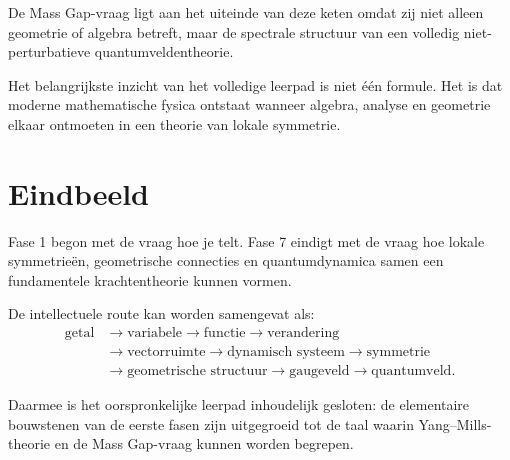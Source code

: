 \documentclass[11pt,a4paper]{article}
\begin{document}
De Mass Gap-vraag ligt aan het uiteinde van deze keten omdat zij niet alleen geometrie of algebra betreft, maar de spectrale structuur van een volledig niet-perturbatieve quantumveldentheorie.

\begin{kernidee}
Het belangrijkste inzicht van het volledige leerpad is niet één formule. Het is dat moderne mathematische fysica ontstaat wanneer algebra, analyse en geometrie elkaar ontmoeten in een theorie van lokale symmetrie.
\end{kernidee}

\section*{Eindbeeld}

Fase 1 begon met de vraag hoe je telt. Fase 7 eindigt met de vraag hoe lokale symmetrieën, geometrische connecties en quantumdynamica samen een fundamentele krachtentheorie kunnen vormen.

De intellectuele route kan worden samengevat als:
\[
\begin{aligned}
\text{getal} &\to \text{variabele} \to \text{functie} \to \text{verandering} \\
&\to \text{vectorruimte} \to \text{dynamisch systeem} \to \text{symmetrie} \\
&\to \text{geometrische structuur} \to \text{gaugeveld} \to \text{quantumveld}.
\end{aligned}
\]

Daarmee is het oorspronkelijke leerpad inhoudelijk gesloten: de elementaire bouwstenen van de eerste fasen zijn uitgegroeid tot de taal waarin Yang--Mills-theorie en de Mass Gap-vraag kunnen worden begrepen.
\end{document}
